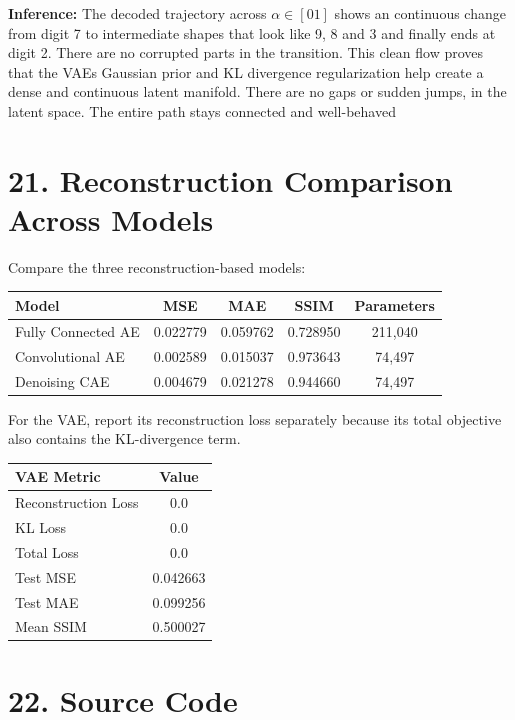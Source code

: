 \documentclass[10pt]{article}
\begin{document}
\textbf{Inference:} The decoded trajectory across $\alpha \in [0 1]$ shows an continuous change from digit 7 to intermediate shapes that look like 9, 8 and 3 and finally ends at digit 2. There are no corrupted parts in the transition. This clean flow proves that the VAEs Gaussian prior and KL divergence regularization help create a dense and continuous latent manifold. There are no gaps or sudden jumps, in the latent space. The entire path stays connected and well-behaved
\clearpage

\section*{21. Reconstruction Comparison Across Models}

Compare the three reconstruction-based models:

\begin{center}
\begin{tabular}{|l|c|c|c|c|}
\hline
Model & MSE & MAE & SSIM & Parameters\\
\hline
Fully Connected AE & 0.022779 & 0.059762 & 0.728950 & 211,040 \\
Convolutional AE & 0.002589 & 0.015037 & 0.973643 & 74,497\\
Denoising CAE & 0.004679 & 0.021278 & 0.944660 & 74,497\\
\hline
\end{tabular}
\end{center}

For the VAE, report its reconstruction loss separately because its total
objective also contains the KL-divergence term.

\begin{center}
\begin{tabular}{|l|c|}
\hline
VAE Metric & Value\\
\hline
Reconstruction Loss & 0.0 \\
KL Loss & 0.0 \\
Total Loss & 0.0 \\
Test MSE & 0.042663 \\
Test MAE & 0.099256 \\
Mean SSIM & 0.500027 \\
\hline
\end{tabular}
\end{center}

\section*{22. Source Code }
\end{document}
